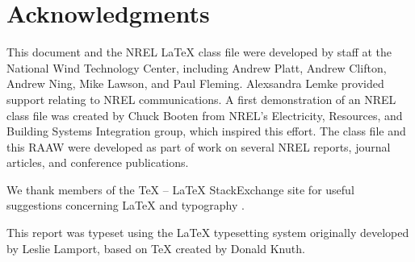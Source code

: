 \section*{Acknowledgments}
This document and the NREL LaTeX class file were developed by staff at the National Wind Technology Center, including Andrew Platt, Andrew Clifton, Andrew Ning, Mike Lawson, and Paul Fleming. Alexsandra Lemke provided support relating to NREL communications. A first demonstration of an NREL class file was created by Chuck Booten from NREL's Electricity, Resources, and Building Systems Integration group, which inspired this effort. The class file and this RAAW were developed as part of work on several NREL reports, journal articles, and conference publications. 

We thank members of the TeX -- LaTeX StackExchange site for useful suggestions concerning LaTeX and typography \citep{texstackexchange}.

This report was typeset using the LaTeX typesetting system originally developed by Leslie Lamport, based on TeX created by Donald Knuth.
